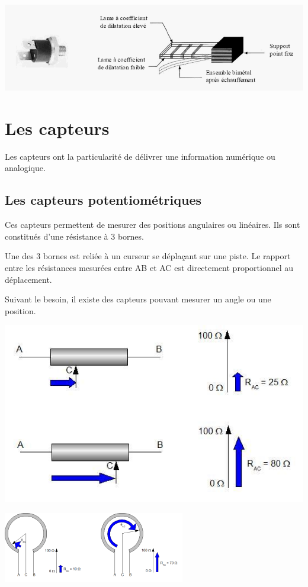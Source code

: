 \documentclass[10pt]{article}
\begin{document}
\begin{center}
\includegraphics[width=.4\textwidth]{images/thermostat}
\end{center}

\section{Les capteurs}
Les capteurs ont la particularité de délivrer une information numérique ou analogique.

\subsection{Les capteurs potentiométriques}
\begin{minipage}[c]{.4\linewidth}
Ces capteurs permettent de mesurer des positions angulaires ou linéaires. Ils sont constitués d'une résistance à 3 bornes. 

Une des 3 bornes est reliée à un curseur se déplaçant sur une piste. Le rapport entre les résistances mesurées entre AB et AC est directement proportionnel au déplacement. 

Suivant le besoin, il existe des capteurs pouvant mesurer un angle ou une position.
\end{minipage} \hfill
\begin{minipage}[c]{.55\linewidth}
\begin{center}
\includegraphics[width=.9\textwidth]{images/potentiometre}

\includegraphics[width=.9\textwidth]{images/potentiometre_2}
\end{center}
\end{minipage}
\end{document}
